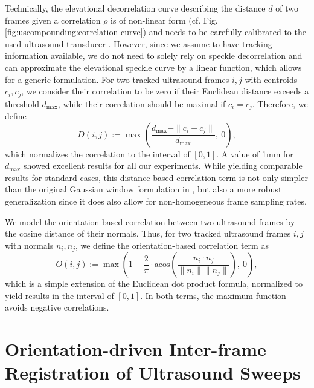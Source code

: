 Technically, the elevational decorrelation curve describing the distance $d$ of two frames given a correlation $\rho$ is of non-linear form (cf. Fig. \ref{fig:uscompounding:correlation-curve}) and needs to be carefully calibrated to the used ultrasound transducer \cite{Housden07,Chen97,Afsham14}.
However, since we assume to have tracking information available, we do not need to solely rely on speckle decorrelation and can approximate the elevational speckle curve by a linear function, which allows for a generic formulation.
For two tracked ultrasound frames $i, j$ with centroids $c_i, c_j$, we consider their correlation to be zero if their Euclidean distance exceeds a threshold $d_\text{max}$, while their correlation should be maximal if $c_i = c_j$.
Therefore, we define
\begin{equation}
	\label{eq:uscompounding:distance-term}
	D(i, j) := \max \left( \frac{d_\text{max} - \|c_i - c_j\|}{d_\text{max}} , \ 0 \right),
\end{equation}
which normalizes the correlation to the interval of $[0, 1]$.
A value of 1mm for $d_\text{max}$ showed excellent results for all our experiments.
While yielding comparable results for standard cases, this distance-based correlation term is not only simpler than the original Gaussian window formulation in \cite{Schultezub14}, but also a more robust generalization since it does also allow for non-homogeneous frame sampling rates.

We model the orientation-based correlation between two ultrasound frames by the cosine distance of their normals.
Thus, for two tracked ultrasound frames $i, j$ with normals $n_i, n_j$, we define the orientation-based correlation term as
\begin{equation}
	\label{eq:uscompounding:cosine-similarity}
	O(i, j) := \max \left( 1 - \frac{2}{\pi} \cdot \text{acos} \left( \frac{n_i \cdot n_j}{\|n_i\| \|n_j\|} \right) , \ 0 \right),
\end{equation}
which is a simple extension of the Euclidean dot product formula, normalized to yield results in the interval of $[0, 1]$.
In both terms, the maximum function avoids negative correlations.


\section{Orientation-driven Inter-frame Registration of Ultrasound Sweeps}
\label{sec:uscompounding:pressure-comp}

